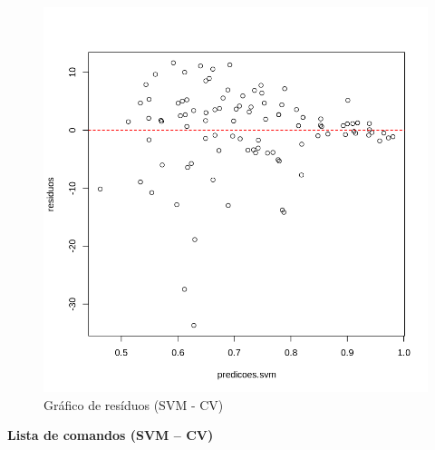 \begin{figure}[H]
\centering
\caption{Gráfico de resíduos (SVM - CV)}
\includegraphics[width=.8\linewidth]{apendices/fig/8_IAA008_15.png}
\end{figure}

\begin{center}
    \textbf{Lista de comandos (SVM – CV)}
\end{center}


